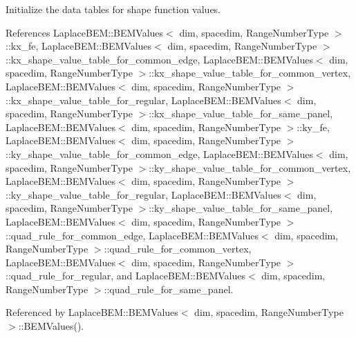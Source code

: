 Initialize the data tables for shape function values. 

References Laplace\+B\+E\+M\+::\+B\+E\+M\+Values$<$ dim, spacedim, Range\+Number\+Type $>$\+::kx\+\_\+fe, Laplace\+B\+E\+M\+::\+B\+E\+M\+Values$<$ dim, spacedim, Range\+Number\+Type $>$\+::kx\+\_\+shape\+\_\+value\+\_\+table\+\_\+for\+\_\+common\+\_\+edge, Laplace\+B\+E\+M\+::\+B\+E\+M\+Values$<$ dim, spacedim, Range\+Number\+Type $>$\+::kx\+\_\+shape\+\_\+value\+\_\+table\+\_\+for\+\_\+common\+\_\+vertex, Laplace\+B\+E\+M\+::\+B\+E\+M\+Values$<$ dim, spacedim, Range\+Number\+Type $>$\+::kx\+\_\+shape\+\_\+value\+\_\+table\+\_\+for\+\_\+regular, Laplace\+B\+E\+M\+::\+B\+E\+M\+Values$<$ dim, spacedim, Range\+Number\+Type $>$\+::kx\+\_\+shape\+\_\+value\+\_\+table\+\_\+for\+\_\+same\+\_\+panel, Laplace\+B\+E\+M\+::\+B\+E\+M\+Values$<$ dim, spacedim, Range\+Number\+Type $>$\+::ky\+\_\+fe, Laplace\+B\+E\+M\+::\+B\+E\+M\+Values$<$ dim, spacedim, Range\+Number\+Type $>$\+::ky\+\_\+shape\+\_\+value\+\_\+table\+\_\+for\+\_\+common\+\_\+edge, Laplace\+B\+E\+M\+::\+B\+E\+M\+Values$<$ dim, spacedim, Range\+Number\+Type $>$\+::ky\+\_\+shape\+\_\+value\+\_\+table\+\_\+for\+\_\+common\+\_\+vertex, Laplace\+B\+E\+M\+::\+B\+E\+M\+Values$<$ dim, spacedim, Range\+Number\+Type $>$\+::ky\+\_\+shape\+\_\+value\+\_\+table\+\_\+for\+\_\+regular, Laplace\+B\+E\+M\+::\+B\+E\+M\+Values$<$ dim, spacedim, Range\+Number\+Type $>$\+::ky\+\_\+shape\+\_\+value\+\_\+table\+\_\+for\+\_\+same\+\_\+panel, Laplace\+B\+E\+M\+::\+B\+E\+M\+Values$<$ dim, spacedim, Range\+Number\+Type $>$\+::quad\+\_\+rule\+\_\+for\+\_\+common\+\_\+edge, Laplace\+B\+E\+M\+::\+B\+E\+M\+Values$<$ dim, spacedim, Range\+Number\+Type $>$\+::quad\+\_\+rule\+\_\+for\+\_\+common\+\_\+vertex, Laplace\+B\+E\+M\+::\+B\+E\+M\+Values$<$ dim, spacedim, Range\+Number\+Type $>$\+::quad\+\_\+rule\+\_\+for\+\_\+regular, and Laplace\+B\+E\+M\+::\+B\+E\+M\+Values$<$ dim, spacedim, Range\+Number\+Type $>$\+::quad\+\_\+rule\+\_\+for\+\_\+same\+\_\+panel.



Referenced by Laplace\+B\+E\+M\+::\+B\+E\+M\+Values$<$ dim, spacedim, Range\+Number\+Type $>$\+::\+B\+E\+M\+Values().

\mbox{\label{classLaplaceBEM_1_1BEMValues_a71328aee0f80bcea63897444b086de99}} 
